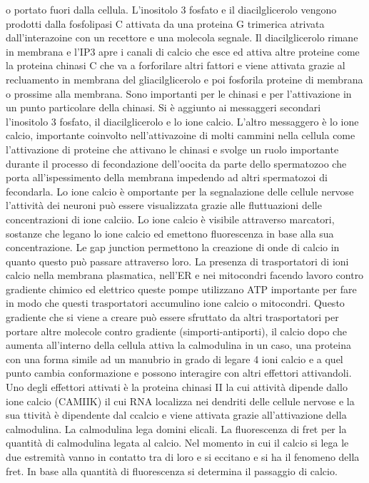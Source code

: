 o portato fuori dalla cellula. L'inositolo 3 fosfato e il diacilglicerolo vengono prodotti dalla fosfolipasi C attivata da una proteina G trimerica atrivata dall'interazoine con un 
recettore e una molecola segnale. Il diacilglicerolo rimane in membrana e l'IP3 apre i canali di calcio che esce ed attiva altre proteine come la proteina chinasi C che va a forforilare 
altri fattori e viene attivata grazie al recluamento in membrana del gliacilglicerolo e poi fosforila proteine di membrana o prossime alla membrana. Sono importanti per le chinasi e per
l'attivazione in un punto particolare della chinasi. Si \`e aggiunto ai messaggeri secondari l'inositolo 3 fosfato, il diacilglicerolo e lo ione calcio. L'altro messaggero \`e lo ione
calcio, importante coinvolto nell'attivazoine di molti cammini nella cellula come l'attivazione di proteine che attivano le chinasi e svolge un ruolo importante durante il processo
di fecondazione dell'oocita da parte dello spermatozoo che porta all'ispessimento della membrana impedendo ad altri spermatozoi di fecondarla. Lo ione calcio \`e omportante per la 
segnalazione delle cellule nervose l'attivit\`a dei neuroni pu\`o essere visualizzata grazie alle fluttuazioni delle concentrazioni di ione calciio. Lo ione calcio \`e visibile 
attraverso marcatori, sostanze che legano lo ione calcio ed emettono fluorescenza in base alla sua concentrazione. Le gap junction permettono la creazione di onde di calcio in quanto
questo pu\`o passare attraverso loro. La presenza di trasportatori di ioni calcio nella membrana plasmatica, nell'ER e nei mitocondri facendo lavoro contro gradiente chimico ed elettrico
queste pompe utilizzano ATP importante per fare in modo che questi trasportatori accumulino ione calcio o mitocondri. Questo gradiente che si viene a creare pu\`o essere sfruttato da
altri trasportatori per portare altre molecole contro gradiente (simporti-antiporti), il calcio dopo che aumenta all'interno della cellula attiva la calmodulina in un caso, una proteina
con una forma simile ad un manubrio in grado di legare 4 ioni calcio e a quel punto cambia conformazione e possono interagire con altri effettori attivandoli. Uno degli effettori attivati
\`e la proteina chinasi II la cui attivit\`a dipende dallo ione calcio (CAMIIK) il cui RNA localizza nei dendriti delle cellule nervose e la sua ttivit\`a \`e dipendente dal ccalcio e 
viene attivata grazie all'attivazione della calmodulina. La calmodulina lega domini elicali. La fluorescenza di fret per la quantit\`a di calmodulina legata al calcio. Nel momento in cui 
il calcio si lega le due estremit\`a vanno in contatto tra di loro e si eccitano e si ha il fenomeno della fret. In base alla quantit\`a di fluorescenza si determina il passaggio di 
calcio. 
